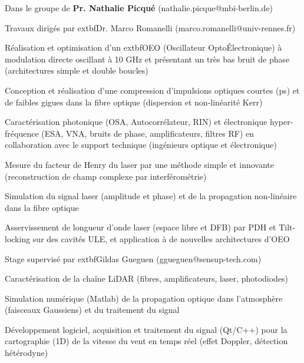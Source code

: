 \documentclass[9pt,a4paper,academicons]{altacv}
\begin{document}
Dans le groupe de \textbf{Pr. Nathalie Picqué} (nathalie.picque@mbi-berlin.de)
\divider


Travaux dirigés par 	extbf{Dr. Marco Romanelli} (marco.romanelli@univ-rennes.fr)

\begin{cvlistdescription}
		\item Réalisation et optimisation d'un 	extbf{OEO} (Oscillateur Opto\'Electronique) à modulation directe oscillant à 10 GHz et présentant un très bas bruit de phase (architectures simple et double boucles)
		\item Conception et réalisation d'une compression d'impulsions optiques courtes (ps) et de faibles gigues dans la fibre optique (dispersion et non-linéarité Kerr)
		\item Caractérisation photonique (OSA, Autocorrélateur, RIN) et électronique hyper-fréquence (ESA, VNA, bruits de phase, amplificateurs, filtres RF) en collaboration avec le support technique (ingénieurs optique et électronique)
		\item Mesure du facteur de Henry du laser par une méthode simple et innovante (reconstruction de champ complexe par interférométrie)
		\item Simulation  du signal laser (amplitude et phase) et de la propagation non-linéaire dans la fibre optique
		\item Asservissement de longueur d'onde laser (espace libre et DFB) par PDH et Tilt-locking sur des cavités ULE, et application à de nouvelles architectures d'OEO
\end{cvlistdescription}

\divider



Stage supervisé par 	extbf{Gildas Gueguen} (ggueguen@sensup-tech.com)

\begin{cvlistdescription}
		\item Caractérisation de la chaîne LiDAR (fibres, amplificateurs, laser, photodiodes)
		\item Simulation numérique (Matlab) de la propagation optique dans l'atmosphère (faisceaux Gaussiens) et du traitement du signal
		\item Développement logiciel, acquisition et traitement du signal (Qt/C++) pour la cartographie (1D) de la vitesse du vent en temps réel (effet Doppler, détection hétérodyne)
\end{cvlistdescription}
\end{document}
